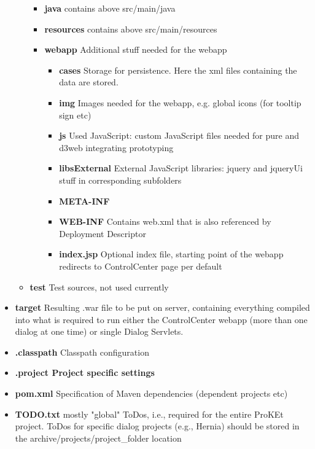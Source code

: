 \documentclass[a4paper,10pt]{scrreprt}
\begin{document}
\begin{footnotesize}
\begin{itemize}
\begin{itemize}
		\begin{itemize}
			\item \textbf{java} contains above src/main/java
			\item \textbf{resources} contains above src/main/resources
			\item \textbf{webapp} Additional stuff needed for the webapp
			\begin{itemize}
				\item \textbf{cases} Storage for persistence. Here the xml files containing the data are stored.
				\item \textbf{img} Images needed for the webapp, e.g. global icons (for tooltip sign etc)
				\item \textbf{js} Used JavaScript: custom JavaScript files needed for pure and d3web integrating prototyping
				\item \textbf{libsExternal} External JavaScript libraries: jquery and jqueryUi stuff in corresponding subfolders
				\item \textbf{META-INF} 
				\item \textbf{WEB-INF} Contains web.xml that is also referenced by Deployment Descriptor
				\item \textbf{index.jsp} Optional index file, starting point of the webapp\\
				redirects to ControlCenter page per default
			\end{itemize}
		\end{itemize}
		\item \textbf{test} Test sources, not used currently
	\end{itemize}
	\item \textbf{target} Resulting .war file to be put on server, containing everything compiled into what is required
	to run either the ControlCenter webapp (more than one dialog at one time) or single Dialog Servlets.
	\item \textbf{.classpath} Classpath configuration
	\item \textbf{.project Project specific settings}
	\item \textbf{pom.xml} Specification of Maven dependencies (dependent projects etc)
	\item \textbf{TODO.txt} mostly "global" ToDos, i.e., required for the entire ProKEt project. ToDos for specific dialog projects (e.g., Hernia) should be stored in the archive/projects/project\_folder location
\end{itemize}
\end{footnotesize}
\end{document}
